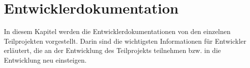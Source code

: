 \chapter{Entwicklerdokumentation}

In diesem Kapitel werden die Entwicklerdokumentationen von den einzelnen Teilprojekten vorgestellt. Darin sind die wichtigsten Informationen für Entwickler erläutert, die an der Entwicklung des Teilprojekts teilnehmen bzw. in die Entwicklung neu einsteigen.










 
